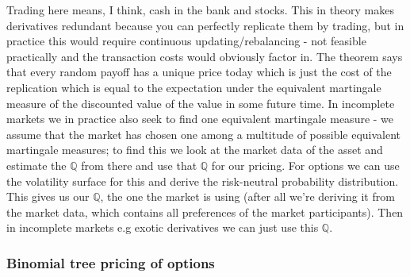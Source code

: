 \documentclass[9pt]{extarticle}
\begin{document}
Trading here means, I think, cash in the bank and stocks. This in theory makes derivatives redundant because you can 
perfectly replicate them by trading, but in practice this would require continuous updating/rebalancing - not 
feasible practically and the 
transaction costs would obviously factor in. The theorem says that every random payoff has a unique 
price today which is just the cost of the replication which is equal to the expectation under the 
equivalent martingale measure of the discounted value of the value in some future time. In incomplete markets we in 
practice also seek to find one equivalent martingale measure - we assume that the market has chosen one 
among a multitude of possible equivalent martingale measures; to find this we look at the market data of the 
asset and estimate the $\mathbb{Q}$ from there and use that $\mathbb{Q}$ for our pricing. For options we can 
use the volatility surface for this and derive the risk-neutral probability distribution. This gives us our $\mathbb{Q}$, the one 
the market is using (after all we're deriving it from the market data, which contains all preferences of the market participants). Then 
in incomplete markets e.g exotic derivatives we can just use this $\mathbb{Q}$.

\subsubsection{Binomial tree pricing of options}
\end{document}
